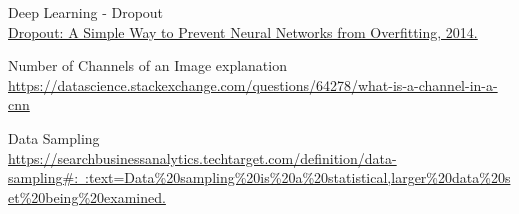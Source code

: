 \documentclass[12pt,letterpaper]{report}
\begin{document}
\begin{thebibliography}{15}
Deep Learning - Dropout
\\\href{https://jmlr.org/papers/v15/srivastava14a.html}{Dropout: A Simple Way to Prevent Neural Networks from Overfitting, 2014.}



Number of Channels of an Image explanation
\\\href{https://datascience.stackexchange.com/questions/64278/what-is-a-channel-in-a-cnn}{https://datascience.stackexchange.com/questions/64278/what-is-a-channel-in-a-cnn}



Data Sampling
\\\href{https://searchbusinessanalytics.techtarget.com/definition/data-sampling\#{}:~:text=Data\%20sampling\%20is\%20a\%20statistical,larger\%20data\%20set\%20being\%20examined.}{https://searchbusinessanalytics.techtarget.com/definition/data-sampling\#{}:~:text=Data\%20sampling\%20is\%20a\%20statistical,larger\%20data\%20set\%20being\%20examined.}

\end{thebibliography}
\end{document}
